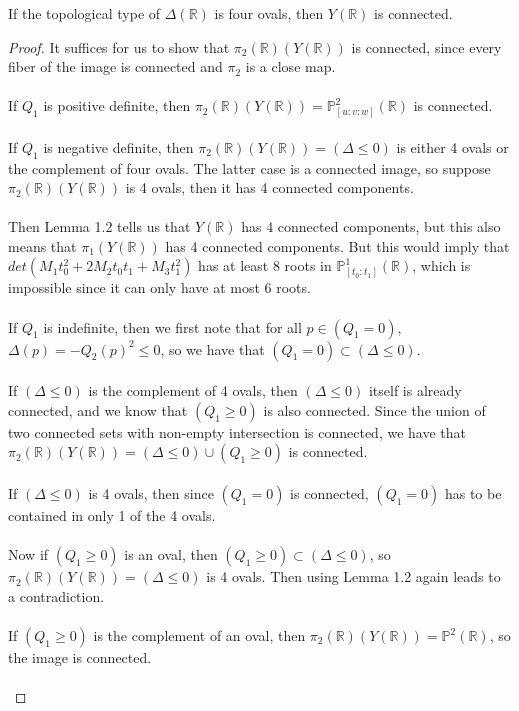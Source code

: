 \documentclass{article}
\newcommand{\Rbb}{\mathbb{R}}
\newcommand{\Pbb}{\mathbb{P}}
\begin{document}
\begin{proposition}
If the topological type of $\Delta(\Rbb)$ is four ovals, then $Y(\Rbb)$ is connected.
\end{proposition}

\begin{proof}
It suffices for us to show that $\pi_2(\Rbb)(Y(\Rbb))$ is connected, since every fiber of the image is connected and $\pi_2$ is a close map.\\\\
If $Q_1$ is positive definite, then $\pi_2(\Rbb)(Y(\Rbb)) = \Pbb^2_{[u:v:w]}(\Rbb)$ is connected.\\\\
If $Q_1$ is negative definite, then $\pi_2(\Rbb)(Y(\Rbb)) = (\Delta \leq 0)$ is either 4 ovals or the complement of four ovals. The latter case is a connected image, so suppose $\pi_2(\Rbb)(Y(\Rbb))$ is 4 ovals, then it has 4 connected components.\\\\
Then Lemma 1.2 tells us that $Y(\Rbb)$ has $4$ connected components, but this also means that $\pi_1(Y(\Rbb))$ has 4 connected components. But this would imply that $det(M_1t_0^2 + 2M_2t_0t_1 + M_3t_1^2)$ has at least $8$ roots in $\Pbb^1_{[t_0:t_1]}(\Rbb)$, which is impossible since it can only have at most $6$ roots.\\\\
If $Q_1$ is indefinite, then we first note that for all $p \in (Q_1 = 0)$, $\Delta(p) = -Q_2(p)^2 \leq 0$, so we have that $(Q_1 = 0) \subset (\Delta \leq 0)$.\\\\
If $(\Delta \leq 0)$ is the complement of 4 ovals, then $(\Delta \leq 0)$ itself is already connected, and we know that $(Q_1 \geq 0)$ is also connected. Since the union of two connected sets with non-empty intersection is connected, we have that $\pi_2(\Rbb)(Y(\Rbb)) = (\Delta \leq 0) \cup (Q_1 \geq 0)$ is connected.\\\\
If $(\Delta \leq 0)$ is 4 ovals, then since $(Q_1 = 0)$ is connected, $(Q_1 = 0)$ has to be contained in only 1 of the 4 ovals.\\\\
Now if $(Q_1 \geq 0)$ is an oval, then $(Q_1 \geq 0) \subset (\Delta \leq 0)$, so $\pi_2(\Rbb)(Y(\Rbb)) = (\Delta \leq 0)$ is 4 ovals. Then using Lemma 1.2 again leads to a contradiction.\\\\
If $(Q_1 \geq 0)$ is the complement of an oval, then $\pi_2(\Rbb)(Y(\Rbb)) = \Pbb^2(\Rbb)$, so the image is connected.\\\\
\end{proof}
\end{document}

